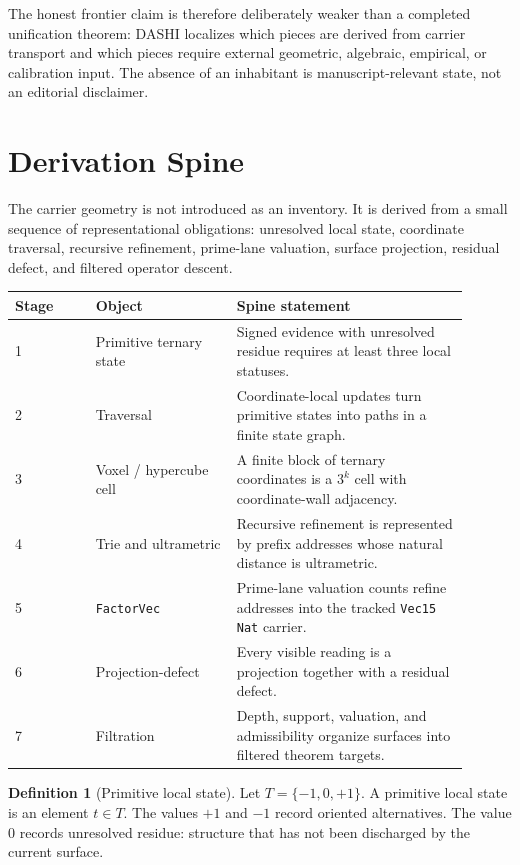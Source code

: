\documentclass[11pt]{article}
\theoremstyle{definition}
\newtheorem{definition}{Definition}[section]
\theoremstyle{plain}
\theoremstyle{remark}
\begin{document}
The honest frontier claim is therefore deliberately weaker than a completed
unification theorem: DASHI localizes which pieces are derived from carrier
transport and which pieces require external geometric, algebraic, empirical,
or calibration input. The absence of an inhabitant is manuscript-relevant
state, not an editorial disclaimer.


\section{Derivation Spine}

The carrier geometry is not introduced as an inventory. It is derived from a
small sequence of representational obligations: unresolved local state,
coordinate traversal, recursive refinement, prime-lane valuation, surface
projection, residual defect, and filtered operator descent.

\begin{center}
\begin{tabular}{p{0.16\linewidth}p{0.28\linewidth}p{0.46\linewidth}}
\toprule
Stage & Object & Spine statement \\
\midrule
1 & Primitive ternary state & Signed evidence with unresolved residue requires at least three local statuses. \\
2 & Traversal & Coordinate-local updates turn primitive states into paths in a finite state graph. \\
3 & Voxel / hypercube cell & A finite block of ternary coordinates is a \(3^k\) cell with coordinate-wall adjacency. \\
4 & Trie and ultrametric & Recursive refinement is represented by prefix addresses whose natural distance is ultrametric. \\
5 & \texttt{FactorVec} & Prime-lane valuation counts refine addresses into the tracked \texttt{Vec15 Nat} carrier. \\
6 & Projection-defect & Every visible reading is a projection together with a residual defect. \\
7 & Filtration & Depth, support, valuation, and admissibility organize surfaces into filtered theorem targets. \\
\bottomrule
\end{tabular}
\end{center}

\begin{definition}[Primitive local state]
Let \(T=\{-1,0,+1\}\). A primitive local state is an element \(t\in T\).
The values \(+1\) and \(-1\) record oriented alternatives. The value \(0\)
records unresolved residue: structure that has not been discharged by the
current surface.
\end{definition}
\end{document}
